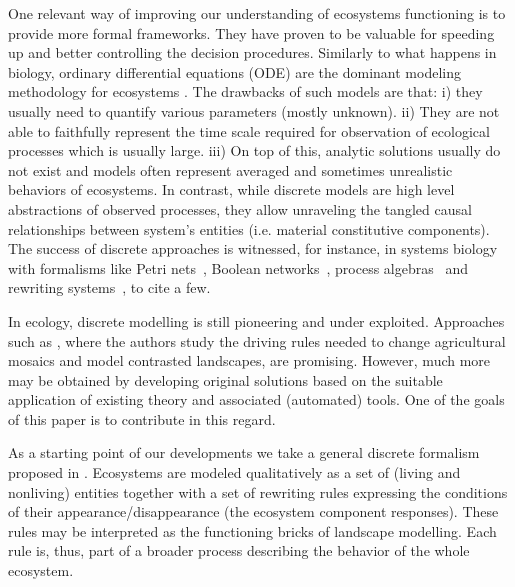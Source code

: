 \documentclass[a4paper,twoside]{article}
\begin{document}

One relevant way of improving our understanding of ecosystems functioning  is to provide more formal frameworks. 
They have proven to be valuable for speeding up and better controlling the decision procedures. 
%	
Similarly to what happens in biology, ordinary differential equations (ODE) are the dominant modeling methodology for ecosystems \cite{may72, Lotka1925}. 
The drawbacks of such  models are that: i) they usually need to quantify various parameters (mostly unknown). ii) They are not able to faithfully represent the time scale required for observation of ecological processes which is usually large. 
iii) On top of this,   analytic solutions usually do not exist and models often represent averaged and sometimes unrealistic behaviors of ecosystems. 
In contrast, while discrete models are high level abstractions of observed processes, they allow unraveling the tangled causal relationships between system's entities (i.e. material constitutive components). 
The success of discrete approaches is witnessed, for instance,  in systems biology with formalisms like Petri
 nets~\cite{DBLP:journals/nc/BaldanCMS10}, Boolean networks~\cite{thomas1973boolean},
 process algebras~\cite{journals/tcsb/Cardelli05} and rewriting systems~\cite{giavitto04a}, to cite a few. 

In ecology, discrete modelling is still pioneering and under exploited. 
Approaches such as \cite{gaucherel2012,gaucherel2014}, where the authors study the driving rules needed to change agricultural mosaics and model contrasted landscapes, are promising. However, much more may be obtained
by developing original solutions based on the suitable application of existing theory and associated (automated) tools. 
One of the goals of this paper is to contribute in this regard. 

As a starting point of our developments we take a general discrete formalism proposed in   \cite{pommereau-gaucherel2017}. Ecosystems are modeled qualitatively as a set of (living and nonliving) entities together with a set of rewriting rules expressing the conditions of their appearance/disappearance (\ie the ecosystem component responses).  
These rules  may be interpreted as the functioning bricks of landscape modelling. 
Each rule is, thus, part of a broader process describing the behavior of the whole ecosystem. 
\end{document}
